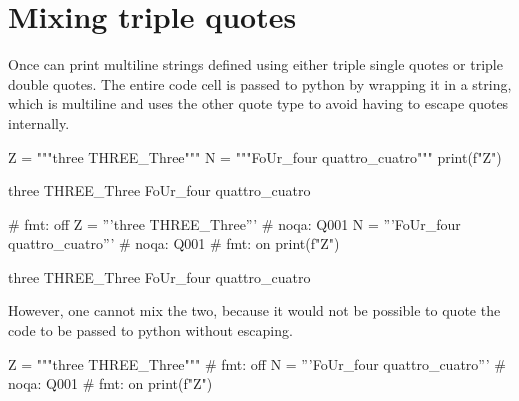 \documentclass[oneside]{book}
\begin{document}
\chapter{Mixing triple quotes}

Once can print multiline strings defined using either triple single quotes or triple double quotes. The entire code cell is passed to python by wrapping it in a string, which is multiline and uses the other quote type to avoid having to escape quotes internally.

\begin{pycell}
Z = """three
THREE_Three"""
N = """FoUr_four
quattro_cuatro"""
print(f"{Z}")
\end{pycell}
\begin{pyexpectedoutput}
three
THREE_Three
FoUr_four
quattro_cuatro
\end{pyexpectedoutput}

\begin{pycell}
# fmt: off
Z = '''three
THREE_Three'''  # noqa: Q001
N = '''FoUr_four
quattro_cuatro'''  # noqa: Q001
# fmt: on
print(f"{Z}")
\end{pycell}
\begin{pyexpectedoutput}
three
THREE_Three
FoUr_four
quattro_cuatro
\end{pyexpectedoutput}

However, one cannot mix the two, because it would not be possible to quote the code to be passed to python without escaping.
\begin{pycell}
Z = """three
THREE_Three"""
# fmt: off
N = '''FoUr_four
quattro_cuatro'''  # noqa: Q001
# fmt: on
print(f"{Z}")
\end{pycell}

\ifPythonTeXLoaded
\else
\fi
\end{document}
